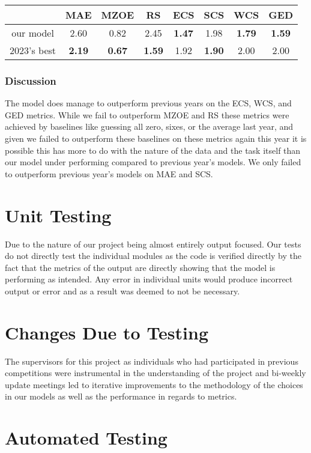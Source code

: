 \documentclass[12pt, titlepage]{article}
\begin{document}
\begin{tabular}{c|ccccccc}
 &  MAE   & MZOE  & RS    & ECS   & SCS   & WCS   & GED \\ \hline
our model  & 2.60  & 0.82  & 2.45  & \textbf{1.47}  & 1.98  & \textbf{1.79}  & \textbf{1.59} \\
2023's best  & \textbf{2.19}  & \textbf{0.67}  & \textbf{1.59}  & 1.92  & \textbf{1.90}  & 2.00  & 2.00 \\
\end{tabular}


\subsubsection{Discussion}
The model does manage to outperform previous years on the ECS, WCS, and GED metrics. While we fail to outperform MZOE and RS these metrics were achieved by baselines like guessing all zero, sixes, or the average last year, and given we failed to outperform these baselines on these metrics again this year it is possible this has more to do with the nature of the data and the task itself than our model under performing compared to previous year's models. We only failed to outperform previous year's models on MAE and SCS.




\section{Unit Testing}


Due to the nature of our project being almost entirely output focused. Our
tests do not directly test the individual modules as the code is verified directly by the
fact that the metrics of the output are directly showing that the model is
performing as intended. Any error in individual units would produce incorrect output or error and as a result was deemed to not be necessary.


\section{Changes Due to Testing}


The supervisors for this project as individuals who had participated in previous competitions were instrumental in the understanding of the project and bi-weekly update meetings led to iterative improvements to the methodology of the choices in our models as well as the performance in regards to metrics.


\section{Automated Testing}
\end{document}
